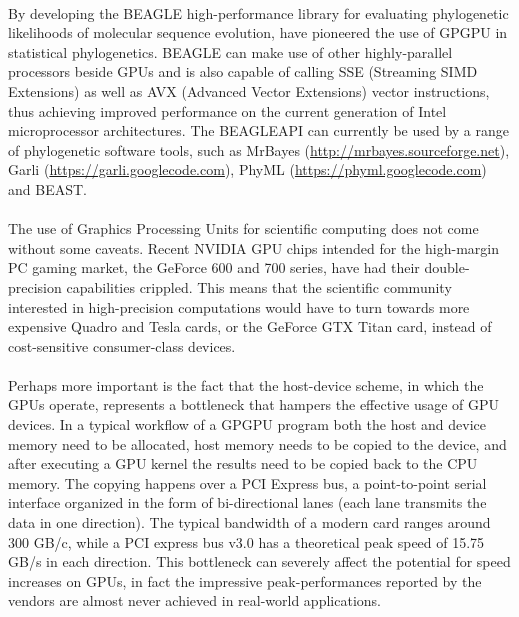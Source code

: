 \paragraph{}
By developing the BEAGLE high-performance library for  evaluating phylogenetic likelihoods of molecular sequence evolution, \cite{Suchard2009} 
have pioneered the use of GPGPU in statistical phylogenetics.
BEAGLE can make use of other highly-parallel processors beside GPUs and is also capable of calling SSE (Streaming SIMD Extensions) as well as AVX (Advanced Vector Extensions) vector instructions, thus achieving improved performance on the current generation of Intel microprocessor architectures.
The BEAGLEAPI \citep{Ayres2012} can currently be used by a range of phylogenetic software tools, such as MrBayes (\url{http://mrbayes.sourceforge.net}), Garli (\url{https://garli.googlecode.com}), PhyML (\url{https://phyml.googlecode.com}) and BEAST.

\paragraph{}
The use of Graphics Processing Units for scientific computing does not come without some caveats.
Recent NVIDIA GPU chips intended for the high-margin PC gaming market, the GeForce 600 and 700 series, have had their double-precision capabilities crippled.
This means that the scientific community interested in high-precision computations would have to turn towards more expensive Quadro and Tesla cards, or the GeForce GTX Titan card, instead of cost-sensitive consumer-class devices.

\paragraph{}
Perhaps more important is the fact that the host-device scheme, in which the GPUs operate, represents a bottleneck that hampers the effective usage of GPU devices.
In a typical workflow of a GPGPU program both the host and device memory need to be allocated, host memory needs to be copied to the device, and after executing a GPU kernel the results need to be copied back to the CPU memory.
The copying happens over a PCI Express bus, a point-to-point serial interface organized in the form of bi-directional lanes (each lane transmits the data in one direction).
The typical bandwidth of a modern card ranges around $300$ GB/c, while a PCI express bus v3.0 has a theoretical peak speed of 15.75 GB/s in each direction.
This bottleneck can severely affect the potential for speed increases on GPUs, in fact the impressive peak-performances reported by the vendors are almost never achieved in real-world applications.

